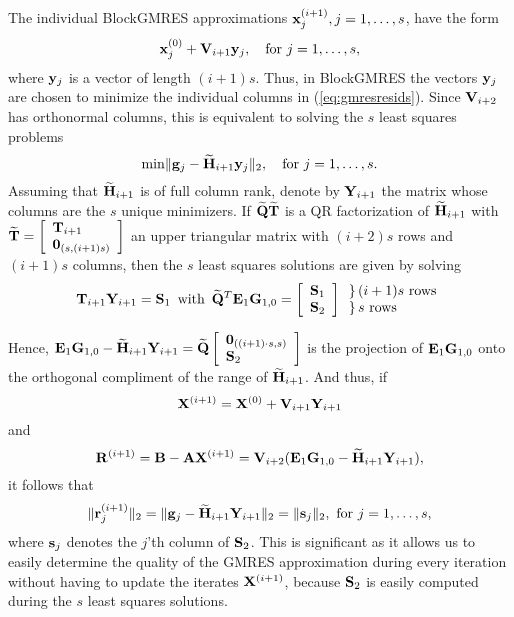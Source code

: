 \documentclass{article}
\newcommand{\bA}{{\bf A}}
\newcommand{\bB}{{\bf B}}
\newcommand{\bE}{{\bf E}}
\newcommand{\bG}{{\bf G}}
\newcommand{\bH}{{\bf H}}
\newcommand{\bQ}{{\bf Q}}
\newcommand{\bR}{{\bf R}}
\newcommand{\bS}{{\bf S}}
\newcommand{\bT}{{\bf T}}
\newcommand{\bV}{{\bf V}}
\newcommand{\bX}{{\bf X}}
\newcommand{\bY}{{\bf Y}}
\newcommand{\bx}{{\bf x}}
\newcommand{\by}{{\bf y}}
\newcommand{\br}{{\bf r}}
\newcommand{\bs}{{\bf s}}
\newcommand{\dm}{\begin{displaymath}}
\newcommand{\edm}{\end{displaymath}}
\begin{document}
The individual BlockGMRES approximations $\bx_j^{(i+1)}, j = 1,
\ldots, s$, have the form
 \dm
 \bx_j^{(0)} + \bV_{i+1} \by_j, \quad {\rm for}~ j = 1, \ldots, s,
 \edm
where $\by_j$ is a vector of length $(i+1)s$. Thus, in BlockGMRES
the vectors $\by_j$ are chosen to minimize the individual columns
in (\ref{eq:gmresresids}). Since $\bV_{i+2}$ has orthonormal
columns, this is equivalent to solving the $s$ least squares
problems
\begin{equation}
{\rm min}\| {\bf g}_j - \widetilde{\bH}_{i+1} \by_j \|_2, \quad
{\rm for}~ j = 1, \ldots, s.
\end{equation}
Assuming that $\widetilde{\bH}_{i+1}$ is of full column rank,
denote by $\bY_{i+1}$ the matrix whose columns are the $s$ unique
minimizers. If $\widetilde{\bQ} \widetilde{\bT}$ is a QR
factorization of $\widetilde{\bH}_{i+1} $ with $\widetilde{\bT} =
\left[
\begin{array}{l} \bT_{i+1} \\ {\bf 0}_{(s,(i+1)s)} \end{array}
\right]$ an upper triangular matrix with $(i+2)s$ rows and
$(i+1)s$ columns, then the $s$ least squares solutions are given
by solving
\begin{equation}
\bT_{i+1} \bY_{i+1} = \bS_1 \,\,\,\mbox{with} \,\,\,
\widetilde{\bQ}^T \bE_1 \bG_{1,0} = \left[ \begin{array}{c} \bS_1
\\ \bS_2
\end{array} \right] \begin{array}{l} \} \, (i+1)s \mbox{ rows}
\\ \} \, s \mbox{ rows} \end{array}
\end{equation}

Hence, $\bE_1 \bG_{1,0} - \widetilde{\bH}_{i+1} \bY_{i+1} =
\widetilde{\bQ} \left[
\begin{array}{l} {\bf 0}_{((i+1) \cdot s, s)} \\ \bS_2 \end{array}
\right] $ is the projection of $\bE_1 \bG_{1,0}$ onto the
orthogonal compliment of the range of $\widetilde{\bH}_{i+1}$. And
thus, if
 \dm
 \bX^{(i+1)} = \bX^{(0)} + \bV_{i+1} \bY_{i+1}
 \edm
and
$$\bR^{(i+1)} = \bB - \bA \bX^{(i+1)} = \bV_{i+2}(\bE_1
\bG_{1,0} - \widetilde{\bH}_{i+1} \bY_{i+1}),$$ it follows that
\begin{equation}
\| \br_j^{(i+1)} \|_2 = \|{\bf g}_j - \widetilde{\bH}_{i+1}
\bY_{i+1} \|_2 = \|\bs_j\|_2, ~{\rm for}~ j = 1,\ldots,s,
\end{equation}
where $\bs_j$ denotes the $j$'th column of $\bS_2$. This is
significant as it allows us to easily determine the quality of the
GMRES approximation during every iteration without having to
update the iterates $\bX^{(i+1)}$, because $\bS_2$ is easily
computed during the $s$ least squares solutions.
\end{document}
